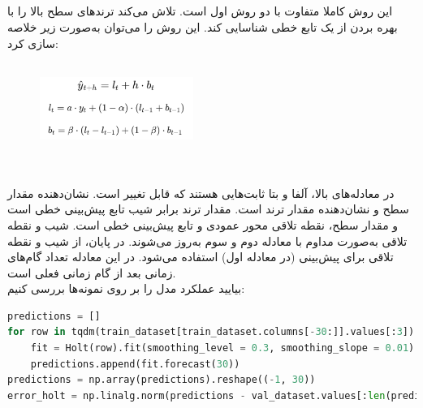 \documentclass{article}
\begin{document}
\subsection*{}
این روش کاملا متفاوت با دو روش اول است.  تلاش می‌کند ترند‌های سطح بالا را با بهره بردن از یک تابع خطی شناسایی کند. این روش را می‌توان به‌صورت زیر خلاصه سازی کرد:
\begin{figure}[hbt!]
	\centering
	\includegraphics[width=5cm,height=3cm]{Outputs/e3.png}
\end{figure}
\ \\
در معادله‌های بالا، آلفا و بتا ثابت‌هایی‌ هستند که قابل تغییر است.  نشان‌دهنده‌ مقدار سطح و   نشان‌دهنده مقدار ترند است. مقدار ترند برابر شیب تابع پیش‌بینی خطی است و مقدار سطح، نقطه تلاقی محور عمودی و تابع پیش‌بینی خطی است. شیب و نقطه تلاقی به‌صورت مداوم با معادله دوم و سوم به‌روز می‌شوند. در پایان، از شیب و نقطه تلاقی برای پیش‌بینی   (در معادله اول) استفاده می‌شود. در این معادله  تعداد گام‌های زمانی بعد از گام زمانی فعلی است.\\
بیایید ‌عملکرد مدل  را بر روی نمونه‌ها بررسی کنیم: 
\begin{latin}
\begin{lstlisting}[language=Python]
predictions = []
for row in tqdm(train_dataset[train_dataset.columns[-30:]].values[:3]):
	fit = Holt(row).fit(smoothing_level = 0.3, smoothing_slope = 0.01)
	predictions.append(fit.forecast(30))
predictions = np.array(predictions).reshape((-1, 30))
error_holt = np.linalg.norm(predictions - val_dataset.values[:len(predictions)])/len(predictions[0])
\end{lstlisting}
\end{latin}
\end{document}
